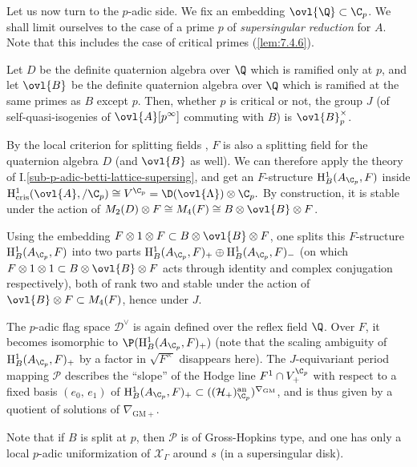 \begin{para}\label{para:7.6.2} Let us now turn to the $p$-adic side. We fix an
embedding $\ovl{\Q} 
\subset \C_p$. We shall limit ourselves to the case of a prime $p$ of
 {\it supersingular reduction} for $A$. Note that this includes the case
 of critical primes (\ref{lem:7.4.6}).


 Let $D$ be the definite quaternion algebra over $\Q$ which is ramified
 only at $p$, and let $\ovl{B}$ be the definite quaternion algebra over
 $\Q$ which is ramified at the same primes as $B$ except $p$. Then,
 whether $p$ is critical or not, the group $J$ (of self-quasi-isogenies
 of $\ovl{A}[p^\infty]$ commuting with $B$) is $\ovl{B}_p^\times$.
 

 By the local criterion for splitting fields \cite[III.3.5]{adadq}, $F$
 is also a splitting field for the quaternion algebra $D$ (and $\ovl{B}$
 as well). We can therefore apply the theory of
 I.\ref{sub-p-adic-betti-lattice-supersing}, and get an 
 $F$-structure $\mathrm{H}^1_B(A_{\C_p},F)$ inside
 $\mathrm{H}^1_{\mathrm{cris}}(\ovl{A},/\C_p)\cong
 V^{\C_p}=\D(\ovl{\Lambda})\otimes \C_p.$ By construction, it is stable
 under the action of $M_2(D)\otimes F\cong M_4(F)\cong B\otimes \ovl{B}
 \otimes F$.


 Using the embedding $F\otimes 1\otimes F\subset B\otimes \ovl{B} \otimes
 F$, one splits this $F$-structure $\mathrm{H}^1_B(A_{\C_p},F)$ into two parts
 $\mathrm{H}^1_B(A_{\C_p},F)_+\oplus \mathrm{H}^1_B(A_{\C_p},F)_{-}$ (on
 which $F\otimes 
 1\otimes 1\subset B\otimes \ovl{B} \otimes F$ acts through identity and
 complex conjugation respectively), both of rank two and stable under
 the action of $\ovl{B}\otimes F \subset M_4(F)$, hence under $J$.  \par
 The $p$-adic flag space $\mathcal{D}^\vee$ is again defined over the
 reflex field $\Q$. Over $F$, it becomes isomorphic to
 $\P(\mathrm{H}^1_B(A_{\C_p},F)_+)$ (note that the scaling ambiguity of
 $\mathrm{H}^1_B(A_{\C_p},F)_+$ by a factor in $\sqrt{F^\times}$ disappears
 here). The $J$-equivariant period mapping $\mathcal{P}$ describes the
 ``slope'' of the Hodge line $F^1\cap V^{\C_p}_+$ with respect to a
 fixed basis $(e_0,\,e_1)$ of $\mathrm{H}^1_B(A_{\C_p},F)_+\subset
 ((\mathcal{H}_+)_{\C_p}^{\mathrm{an}})^{\nabla_{\mathrm{GM}}}$, and is
 thus given by a quotient of solutions of $\nabla_{\mathrm{GM}+}$.


 Note that if $B$ is split at $p$, then $\mathcal{P}$ is of
 Gross-Hopkins type, and one has only a local $p$-adic uniformization of
 $\mathcal{X}_{\Gamma}$ around $s$ (in a supersingular disk).



\end{para}
